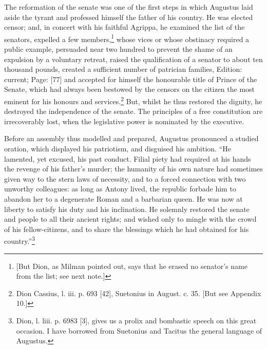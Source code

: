 The reformation of the senate was one of the first steps in which Augustus laid aside the tyrant and professed himself the father of his country. He was elected censor; and, in concert with his faithful Agrippa, he examined the list of the senators, expelled a few members,\footnote{[But Dion, as Milman pointed out, says that he erased no senator\texthebrew{}’s name from the list; see next note.]} whose vices or whose obstinacy required a public example, persuaded near two hundred to prevent the shame of an expulsion by a voluntary retreat, raised the qualification of a senator to about ten thousand pounds, created a sufficient number of patrician families, Edition: current; Page: [77] and accepted for himself the honourable title of Prince of the Senate, which had always been bestowed by the censors on the citizen the most eminent for his honours and services.\footnote{Dion Cassius, l. iii. p. 693 [42], Suetonius in August. c. 35. [But see Appendix 10.]} But, whilst he thus restored the dignity, he destroyed the independence of the senate. The principles of a free constitution are irrecoverably lost, when the legislative power is nominated by the executive.

Before an assembly thus modelled and prepared, Augustus pronounced a studied oration, which displayed his patriotism, and disguised his ambition. \texthebrew{“}He lamented, yet excused, his past conduct. Filial piety had required at his hands the revenge of his father\texthebrew{}’s murder; the humanity of his own nature had sometimes given way to the stern laws of necessity, and to a forced connection with two unworthy colleagues: as long as Antony lived, the republic forbade him to abandon her to a degenerate Roman and a barbarian queen. He was now at liberty to satisfy his duty and his inclination. He solemnly restored the senate and people to all their ancient rights; and wished only to mingle with the crowd of his fellow-citizens, and to share the blessings which he had obtained for his country.\texthebrew{}”\footnote{Dion, l. liii. p. 6983 [3], gives us a prolix and bombastic speech on this great occasion. I have borrowed from Suetonius and Tacitus the general language of Augustus.}


